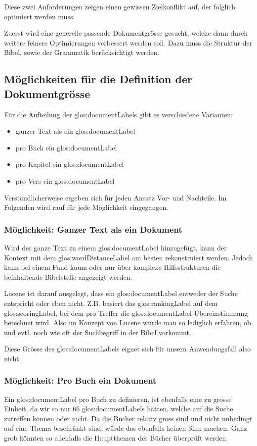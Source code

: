 Diese zwei Anforderungen zeigen einen gewissen Zielkonflikt auf, der folglich optimiert werden muss.

Zuerst wird eine generelle passende Dokumentgrösse gesucht, welche dann durch weitere feinere Optimierungen verbessert werden soll.
Dazu muss die Struktur der Bibel, sowie der Grammatik berücksichtigt werden.

\subsection{Möglichkeiten für die Definition der Dokumentgrösse}
Für die Aufteilung der \glspl{glos:documentLabel} gibt es verschiedene Varianten:
\begin{itemize}
	\item ganzer Text als ein \gls{glos:documentLabel}
	\item pro Buch ein \gls{glos:documentLabel}
	\item pro Kapitel ein \gls{glos:documentLabel}
	\item pro Vers ein \gls{glos:documentLabel}
\end{itemize}

Verständlicherweise ergeben sich für jeden Ansatz Vor- und Nachteile.
Im Folgenden wird rauf für jede Möglichkeit eingegangen.

\subsubsection{Möglichkeit: Ganzer Text als ein Dokument}
Wird der ganze Text zu einem \gls{glos:documentLabel} hinzugefügt, kann der Kontext mit dem \gls{glos:wordDistanceLabel} am besten rekonstruiert werden.
Jedoch kann bei einem Fund kaum oder nur über komplexe Hilfsstrukturen die beinhaltende Bibelstelle angezeigt werden.

Lucene ist darauf ausgelegt, dass ein \gls{glos:documentLabel} entweder der Suche entspricht oder eben nicht.
Z.B. basiert das \gls{glos:rankingLabel} auf dem \gls{glos:scoringLabel}, bei dem pro Treffer die \gls{glos:documentLabel}-Übereinstimmung berechnet wird.
Also im Konzept von Lucene würde man so lediglich erfahren, ob und evtl. noch wie oft der Suchbegriff in der Bibel vorkommt.

Diese Grösse des \gls{glos:documentLabel}s eignet sich für unsern Anwendungsfall also nicht.

\subsubsection{Möglichkeit: Pro Buch ein Dokument}
Ein \gls{glos:documentLabel} pro Buch zu definieren, ist ebenfalls eine zu grosse Einheit, da wir so nur 66 \glspl{glos:documentLabel} hätten, welche auf die Suche zutreffen können oder nicht.
Da die Bücher relativ gross sind und nicht unbedingt auf eine Thema beschränkt sind, würde das ebenfalls keinen Sinn machen.
Ganz grob könnten so allenfalls die Hauptthemen der Bücher überprüft werden.

